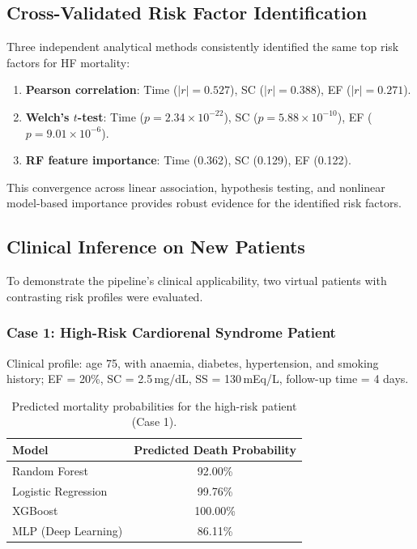\documentclass[12pt,a4paper]{article}
\begin{document}
\subsection{Cross-Validated Risk Factor Identification}

Three independent analytical methods consistently identified the same top risk factors for HF mortality:

\begin{enumerate}
    \item \textbf{Pearson correlation}: Time ($|r|=0.527$), SC ($|r|=0.388$), EF ($|r|=0.271$).
    \item \textbf{Welch's $t$-test}: Time ($p = 2.34\times10^{-22}$), SC ($p = 5.88\times10^{-10}$), EF ($p = 9.01\times10^{-6}$).
    \item \textbf{RF feature importance}: Time (0.362), SC (0.129), EF (0.122).
\end{enumerate}

This convergence across linear association, hypothesis testing, and nonlinear model-based importance provides robust evidence for the identified risk factors.

\subsection{Clinical Inference on New Patients}

To demonstrate the pipeline's clinical applicability, two virtual patients with contrasting risk profiles were evaluated.

\subsubsection{Case 1: High-Risk Cardiorenal Syndrome Patient}

Clinical profile: age 75, with anaemia, diabetes, hypertension, and smoking history; EF = 20\%, SC = 2.5\,mg/dL, SS = 130\,mEq/L, follow-up time = 4 days.

\begin{table}[H]
\centering
\caption{Predicted mortality probabilities for the high-risk patient (Case 1).}
\label{tab:case1}
\begin{tabular}{lc}
\toprule
\textbf{Model} & \textbf{Predicted Death Probability} \\
\midrule
Random Forest       & 92.00\% \\
Logistic Regression & 99.76\% \\
XGBoost             & 100.00\% \\
MLP (Deep Learning) & 86.11\% \\
\bottomrule
\end{tabular}
\end{table}
\end{document}
